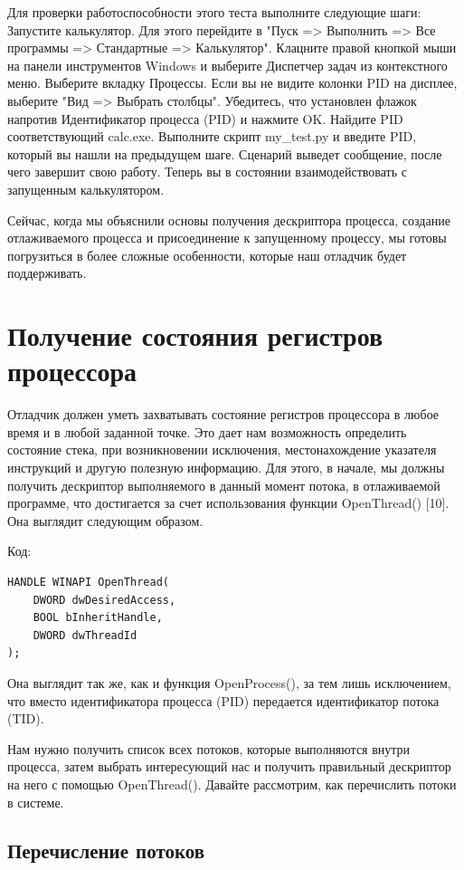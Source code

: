 \documentclass[12pt]{book}
\begin{document}
Для проверки работоспособности этого теста выполните следующие шаги:
Запустите калькулятор. Для этого перейдите в "Пуск => Выполнить => Все программы => Стандартные => Калькулятор".
Клацните правой кнопкой мыши на панели инструментов Windows и выберите Диспетчер задач из контекстного меню.
Выберите вкладку Процессы.
Если вы не видите колонки PID на дисплее, выберите "Вид => Выбрать столбцы".
Убедитесь, что установлен флажок напротив Идентификатор процесса (PID) и нажмите OK.
Найдите PID соответствующий calc.exe.
Выполните скрипт my\_test.py и введите PID, который вы нашли на предыдущем шаге.
Сценарий выведет сообщение, после чего завершит свою работу.
Теперь вы в состоянии взаимодействовать с запущенным калькулятором.

Сейчас, когда мы объяснили основы получения дескриптора процесса, создание отлаживаемого процесса и присоединение к запущенному процессу, мы готовы погрузиться в более сложные особенности, которые наш отладчик будет поддерживать.

\section{Получение состояния регистров процессора}

Отладчик должен уметь захватывать состояние регистров процессора в любое время и в любой заданной точке. Это дает нам возможность определить состояние стека, при возникновении исключения, местонахождение указателя инструкций и другую полезную информацию. Для этого, в начале, мы должны получить дескриптор выполняемого в данный момент потока, в отлаживаемой программе, что достигается за счет использования функции OpenThread() [10]. Она выглядит следующим образом.

Код:
\begin{lstlisting}
HANDLE WINAPI OpenThread(
    DWORD dwDesiredAccess,
    BOOL bInheritHandle,
    DWORD dwThreadId
);
\end{lstlisting}

Она выглядит так же, как и функция OpenProcess(), за тем лишь исключением, что вместо идентификатора процесса (PID) передается идентификатор потока (TID).

Нам нужно получить список всех потоков, которые выполняются внутри процесса, затем выбрать интересующий нас и получить правильный дескриптор на него с помощью OpenThread(). Давайте рассмотрим, как перечислить потоки в системе. 

\subsection{Перечисление потоков}
\end{document}

